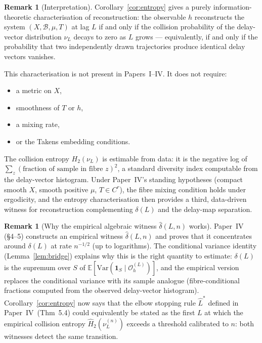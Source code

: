 \documentclass[11pt]{article}
\theoremstyle{definition}
\newtheorem{remark}[theorem]{Remark}
\newcommand{\Bcal}{\mathcal{B}}
\newcommand{\OL}{\mathcal{O}_h^{(L)}}
\newcommand{\dL}{\delta(L)}
\begin{document}
\begin{remark}[Interpretation]
Corollary~\ref{cor:entropy} gives a purely information-theoretic
characterisation of reconstruction: the observable $h$ reconstructs the system
$(X, \Bcal, \mu, T)$ at lag $L$ if and only if the collision probability of the
delay-vector distribution $\nu_L$ decays to zero as $L$ grows --- equivalently,
if and only if the probability that two independently drawn trajectories produce
identical delay vectors vanishes.

This characterisation is not present in Papers~I--IV.
It does not require:
\begin{itemize}
  \item a metric on $X$,
  \item smoothness of $T$ or $h$,
  \item a mixing rate,
  \item or the Takens embedding conditions.
\end{itemize}
The collision entropy $H_2(\nu_L)$ is estimable from data: it is the
negative log of $\sum_z (\text{fraction of sample in fibre } z)^2$,
a standard diversity index computable from the delay-vector histogram.
Under Paper~IV's standing hypotheses (compact smooth $X$, smooth positive $\mu$,
$T \in C^r$), the fibre mixing condition holds under ergodicity, and the
entropy characterisation then provides a third, data-driven witness for
reconstruction complementing $\delta(L)$ and the delay-map separation.
\end{remark}

\begin{remark}[Why the empirical algebraic witness $\hat\delta(L,n)$ works]
\label{rem:empirical-link}
Paper~IV (\S4--5) constructs an empirical witness $\hat\delta(L,n)$ and proves
that it concentrates around $\dL$ at rate $n^{-1/2}$ (up to logarithms).
The conditional variance identity (Lemma~\ref{lem:bridge}) explains why this
is the right quantity to estimate: $\dL$ is the supremum over $S$ of
$\mathbb{E}[\mathrm{Var}(\mathbf{1}_S \mid \OL)]$, and the empirical version
replaces the conditional variance with its sample analogue (fibre-conditional
fractions computed from the observed delay-vector histogram).
Corollary~\ref{cor:entropy} now says that the elbow stopping rule $\hat L^*$
defined in Paper~IV~(Thm~5.4) could equivalently be stated as the first $L$
at which the empirical collision entropy $\hat H_2(\nu_L^{(n)})$ exceeds a
threshold calibrated to $n$: both witnesses detect the same transition.
\end{remark}
\end{document}
